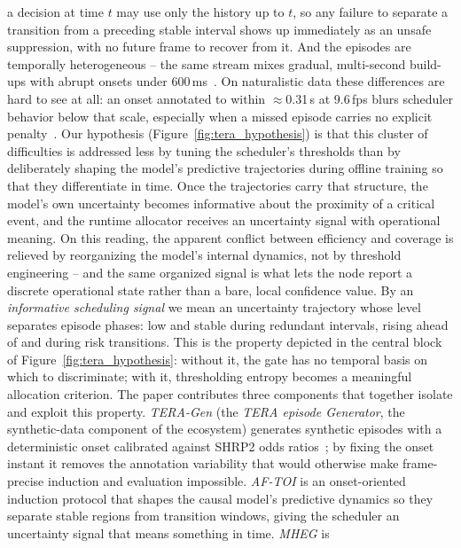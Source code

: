 \documentclass[a4paper,fleqn]{cas-dc}
\begin{document}
a decision at time $t$ may use only the history up to $t$, so any failure to
separate a transition from a preceding stable interval shows up immediately as an
unsafe suppression, with no future frame to recover from it. And the episodes are
temporally heterogeneous -- the same stream mixes gradual, multi-second build-ups
with abrupt onsets under $600$\,ms~\cite{dingus2016shrp2,bouhsissin2023driver}. On
naturalistic data these differences are hard to see at all: an onset annotated to
within $\approx$0.31\,s at 9.6\,fps blurs scheduler behavior below that scale,
especially when a missed episode carries no explicit
penalty~\cite{dingus2016shrp2,fang2022dada,ortega2020dmd}.
Our hypothesis (Figure~\ref{fig:tera_hypothesis}) is that this cluster of
difficulties is addressed less by tuning the scheduler's thresholds than by
deliberately shaping the model's predictive trajectories during offline training so
that they differentiate in time. Once the trajectories carry that structure, the model's own uncertainty becomes informative about the proximity of a critical event, and the runtime allocator receives an uncertainty signal with operational meaning. On this reading, the apparent conflict
between efficiency and coverage is relieved by reorganizing the model's internal
dynamics, not by threshold engineering -- and the same organized signal is what lets
the node report a discrete operational state rather than a bare, local confidence
value.
{\color{\revcolor}By an \emph{informative scheduling signal} we mean an uncertainty
trajectory whose level separates episode phases: low and stable during
redundant intervals, rising ahead of and during risk transitions. This is the
property depicted in the central block of Figure~\ref{fig:tera_hypothesis}:
without it, the gate has no temporal basis on which to discriminate; with it,
thresholding entropy becomes a meaningful allocation criterion.}
The paper contributes three components that together isolate and exploit this
property. \textit{TERA-Gen} {\color{\revcolor}(the \emph{TERA episode Generator}, the synthetic-data component of the ecosystem)} generates synthetic episodes with a deterministic
onset calibrated against SHRP2 odds ratios~\cite{dingus2016shrp2}; by fixing the
onset instant it removes the annotation variability that would otherwise make
frame-precise induction and evaluation impossible. \textit{AF-TOI} is an
onset-oriented induction protocol that shapes the causal model's predictive
dynamics so they separate stable regions from transition windows, giving the
scheduler an uncertainty signal that means something in time. \textit{MHEG} is
\end{document}
